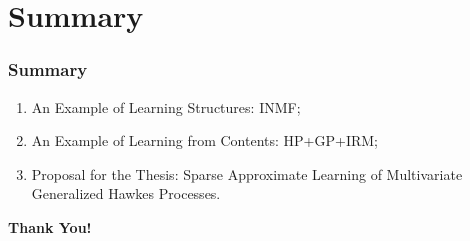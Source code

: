 \documentclass{beamer}
\begin{document}
\section{Summary}
\begin{frame}
\frametitle{Summary}
\begin{center}
\begin{enumerate}
	\item An Example of Learning Structures: INMF;
    \item An Example of Learning from Contents: HP+GP+IRM;
    \item Proposal for the Thesis: Sparse Approximate Learning of Multivariate Generalized Hawkes Processes.
\end{enumerate}
\end{center}
\end{frame}



\begin{frame}
\begin{center}
{\bf{Thank You!}}
\end{center}
\end{frame}
\end{document}
